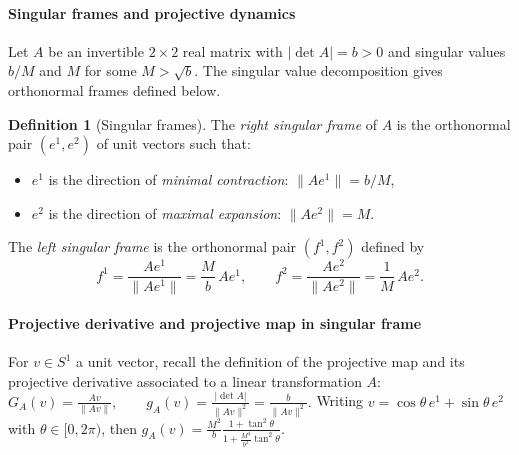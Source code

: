 \documentclass[a4paper,11pt]{article}
\theoremstyle{definition}
\newtheorem{definition}[lemma]{Definition}
\begin{document}
\paragraph{Singular frames and projective dynamics}



Let $A$ be an invertible $2\times 2$ real matrix with $|\det A| = b > 0$ and singular values $b/M$ and $M$ for some $M > \sqrt{b}$. The singular value decomposition gives orthonormal frames defined below.

\begin{definition}[Singular frames]
The \emph{right singular frame} of $A$ is the orthonormal pair $(e^1, e^2)$ of unit vectors such that:
\begin{itemize}
\item $e^1$ is the direction of \emph{minimal contraction}: $\|A e^1\| = b/M$,
\item $e^2$ is the direction of \emph{maximal expansion}: $\|A e^2\| = M$.
\end{itemize}
The \emph{left singular frame} is the orthonormal pair $(f^1, f^2)$ defined by
\[
f^1 = \frac{A e^1}{\|A e^1\|} = \frac{M}{b}\, A e^1, \qquad f^2 = \frac{A e^2}{\|A e^2\|} = \frac{1}{M}\, A e^2.
\]
\end{definition}


\paragraph{Projective derivative and projective map in singular frame}

For $v \in S^1$ a unit vector, recall the definition of the projective map and its projective derivative associated to a linear transformation $A$:
$G_A(v) = \frac{Av}{\|Av\|}, \qquad g_A(v) = \frac{|\det A|}{\|Av\|^2} = \frac{b}{\|Av\|^2}.$
Writing $v = \cos\theta\, e^1 + \sin\theta\, e^2$ with $\theta \in [0, 2\pi)$, then
$g_A(v) = \frac{M^2}{b} \frac{1+\tan^2\theta}{1 + \frac{M^4}{b^2}\tan^2\theta}.$

\end{document}
